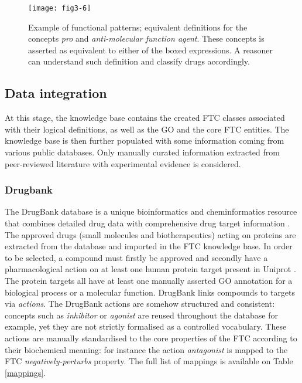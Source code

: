 \begin{figure}[H]
    \centering
    \texttt{[image: fig3-6]}
    \caption{Example of functional patterns; equivalent definitions for the concepts \emph{pro} and \emph{anti-molecular function agent}. These concepts is asserted as equivalent to either of the boxed expressions. A reasoner can understand such definition and classify drugs accordingly.}
    \label{fig3-6}
\end{figure}

\subsection{Data integration}
At this stage, the knowledge base contains the created FTC classes associated with their logical definitions, as well as the GO and the core FTC entities. The knowledge base is then further populated with some information coming from various public databases. Only manually curated information extracted from peer-reviewed literature with experimental evidence is considered.

\subsubsection{Drugbank}
The DrugBank database is a unique bioinformatics and cheminformatics resource that combines detailed drug data with comprehensive drug target information \citep{knox2011drugbank}. The approved drugs (small molecules and biotherapeutics) acting on proteins are extracted from the database and imported in the FTC knowledge base. In order to be selected, a compound must firstly be approved and secondly have a pharmacological action on at least one human protein target present in Uniprot \citep{uniprot2013update}. The protein targets all have at least one manually asserted GO annotation \citep{dimmer2012uniprot} for a biological process or a molecular function. DrugBank links compounds to targets via \emph{actions}. The DrugBank actions are somehow structured and consistent: concepts such as \emph{inhibitor} or \emph{agonist} are reused throughout the database for example, yet they are not strictly formalised as a controlled vocabulary. These actions are manually standardised to the core properties of the FTC according to their biochemical meaning: for instance the action \emph{antagonist} is mapped to the FTC \emph{negatively-perturbs} property. The full list of mappings is available on Table \ref{mappings}.

